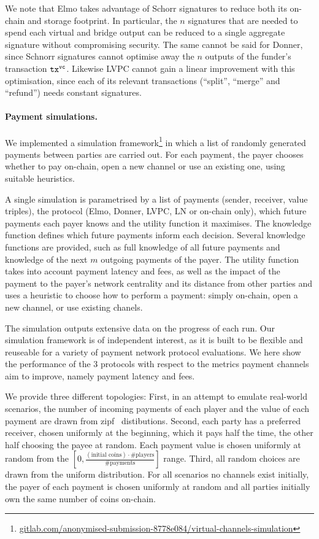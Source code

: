  We note that Elmo takes advantage of Schorr signatures to reduce both its
  on-chain and storage footprint. In particular, the $n$ signatures that are
  needed to spend each virtual and bridge output can be reduced to a single
  aggregate signature without compromising security. The same cannot be said for
  Donner, since Schnorr signatures cannot optimise away the $n$ outputs of the
  funder's transaction $\texttt{tx}^{\mathtt{vc}}$. Likewise LVPC cannot gain a linear
  improvement with this optimisation, since each of its relevant transactions
  (``split'', ``merge'' and ``refund'') needs constant signatures.

  \paragraph{Payment simulations.} We implemented a simulation
  framework\footnote{\url{gitlab.com/anonymised-submission-8778e084/virtual-channels-simulation}}
  in which a list of randomly generated payments between parties are carried
  out. For each payment, the payer chooses whether to pay on-chain,
  open a new channel or use an existing one, using suitable heuristics.

  A single simulation is parametrised by a list of payments
  (sender, receiver, value triples), the protocol (Elmo, Donner, LVPC, LN or
  on-chain only), which future payments each payer knows and the utility
  function it maximises. The knowledge function defines which future payments
  inform each decision. Several knowledge functions are provided, such as full
  knowledge of all future payments and knowledge of the next $m$ outgoing
  payments of the payer. The utility function takes into account payment
  latency and fees, as well as the impact of the payment to the payer's
  network centrality and its distance from other parties and uses a heuristic to
  choose how to perform a payment: simply on-chain, open a new channel, or use
  existing chanels.

  The simulation outputs extensive data on the progress of each run. Our
  simulation framework is of independent interest, as it is built to be flexible
  and reuseable for a variety of payment network protocol evaluations. We here
  show the performance of the $3$ protocols with respect to the metrics payment
  channels aim to improve, namely payment latency and fees.

  We provide three different topologies: First, in an attempt to emulate
  real-world scenarios, the number of incoming payments of each player and the
  value of each payment are drawn from zipf~\cite{powers-1998-applications}
  distibutions. Second, each party has a preferred receiver, chosen uniformly at
  the beginning, which it pays half the time, the other half choosing the payee
  at random. Each payment value is chosen uniformly at random from the $[0,
  \frac{(\text{initial coins}) \cdot \text{\#players}}{\text{\#payments}}]$
  range. Third, all random choices are drawn from the uniform distribution.
  For all scenarios no channels exist initially, the payer of each payment is
  chosen uniformly at random and all parties initially own the same number of
  coins on-chain.

